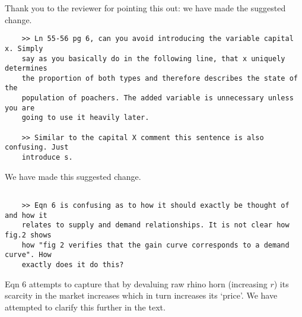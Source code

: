 \documentclass[10pt]{article}
\begin{document}
Thank you to the reviewer for pointing this out: we have made the suggested
change.

\begin{verbatim}
    >> Ln 55-56 pg 6, can you avoid introducing the variable capital x. Simply
    say as you basically do in the following line, that x uniquely determines
    the proportion of both types and therefore describes the state of the
    population of poachers. The added variable is unnecessary unless you are
    going to use it heavily later.

    >> Similar to the capital X comment this sentence is also confusing. Just
    introduce s.

\end{verbatim}

We have made this suggested change.

\begin{verbatim}

    >> Eqn 6 is confusing as to how it should exactly be thought of and how it
    relates to supply and demand relationships. It is not clear how fig.2 shows
    how "fig 2 verifies that the gain curve corresponds to a demand curve". How
    exactly does it do this?
\end{verbatim}

Eqn 6 attempts to capture that by devaluing raw rhino horn (increasing \(r\))
its scarcity in the market increases which in turn increases its `price'.
We have attempted to clarify this further in the text.
\end{document}
